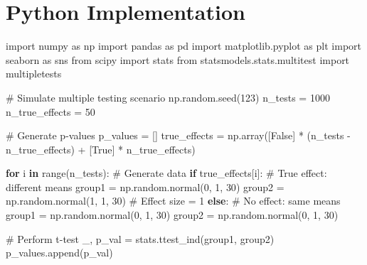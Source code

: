 \documentclass[
  11pt,
  letterpaper,
  oneside]{book}
\newenvironment{Shaded}{\begin{snugshade}}{\end{snugshade}}
\newcommand{\BuiltInTok}[1]{\textcolor[rgb]{0.00,0.23,0.31}{#1}}
\newcommand{\CommentTok}[1]{\textcolor[rgb]{0.37,0.37,0.37}{#1}}
\newcommand{\ControlFlowTok}[1]{\textcolor[rgb]{0.00,0.23,0.31}{\textbf{#1}}}
\newcommand{\DecValTok}[1]{\textcolor[rgb]{0.68,0.00,0.00}{#1}}
\newcommand{\ImportTok}[1]{\textcolor[rgb]{0.00,0.46,0.62}{#1}}
\newcommand{\KeywordTok}[1]{\textcolor[rgb]{0.00,0.23,0.31}{\textbf{#1}}}
\newcommand{\NormalTok}[1]{\textcolor[rgb]{0.00,0.23,0.31}{#1}}
\newcommand{\OperatorTok}[1]{\textcolor[rgb]{0.37,0.37,0.37}{#1}}
\newcommand{\VariableTok}[1]{\textcolor[rgb]{0.07,0.07,0.07}{#1}}
\begin{document}
\section{Python Implementation}\label{python-implementation-1}

\begin{Shaded}
\begin{Highlighting}[]
\ImportTok{import}\NormalTok{ numpy }\ImportTok{as}\NormalTok{ np}
\ImportTok{import}\NormalTok{ pandas }\ImportTok{as}\NormalTok{ pd}
\ImportTok{import}\NormalTok{ matplotlib.pyplot }\ImportTok{as}\NormalTok{ plt}
\ImportTok{import}\NormalTok{ seaborn }\ImportTok{as}\NormalTok{ sns}
\ImportTok{from}\NormalTok{ scipy }\ImportTok{import}\NormalTok{ stats}
\ImportTok{from}\NormalTok{ statsmodels.stats.multitest }\ImportTok{import}\NormalTok{ multipletests}

\CommentTok{\# Simulate multiple testing scenario}
\NormalTok{np.random.seed(}\DecValTok{123}\NormalTok{)}
\NormalTok{n\_tests }\OperatorTok{=} \DecValTok{1000}
\NormalTok{n\_true\_effects }\OperatorTok{=} \DecValTok{50}

\CommentTok{\# Generate p{-}values}
\NormalTok{p\_values }\OperatorTok{=}\NormalTok{ []}
\NormalTok{true\_effects }\OperatorTok{=}\NormalTok{ np.array([}\VariableTok{False}\NormalTok{] }\OperatorTok{*}\NormalTok{ (n\_tests }\OperatorTok{{-}}\NormalTok{ n\_true\_effects) }\OperatorTok{+}\NormalTok{ [}\VariableTok{True}\NormalTok{] }\OperatorTok{*}\NormalTok{ n\_true\_effects)}

\ControlFlowTok{for}\NormalTok{ i }\KeywordTok{in} \BuiltInTok{range}\NormalTok{(n\_tests):}
    \CommentTok{\# Generate data}
    \ControlFlowTok{if}\NormalTok{ true\_effects[i]:}
        \CommentTok{\# True effect: different means}
\NormalTok{        group1 }\OperatorTok{=}\NormalTok{ np.random.normal(}\DecValTok{0}\NormalTok{, }\DecValTok{1}\NormalTok{, }\DecValTok{30}\NormalTok{)}
\NormalTok{        group2 }\OperatorTok{=}\NormalTok{ np.random.normal(}\DecValTok{1}\NormalTok{, }\DecValTok{1}\NormalTok{, }\DecValTok{30}\NormalTok{)  }\CommentTok{\# Effect size = 1}
    \ControlFlowTok{else}\NormalTok{:}
        \CommentTok{\# No effect: same means}
\NormalTok{        group1 }\OperatorTok{=}\NormalTok{ np.random.normal(}\DecValTok{0}\NormalTok{, }\DecValTok{1}\NormalTok{, }\DecValTok{30}\NormalTok{)}
\NormalTok{        group2 }\OperatorTok{=}\NormalTok{ np.random.normal(}\DecValTok{0}\NormalTok{, }\DecValTok{1}\NormalTok{, }\DecValTok{30}\NormalTok{)}

    \CommentTok{\# Perform t{-}test}
\NormalTok{    \_, p\_val }\OperatorTok{=}\NormalTok{ stats.ttest\_ind(group1, group2)}
\NormalTok{    p\_values.append(p\_val)}


\end{Highlighting}
\end{Shaded}
\end{document}
